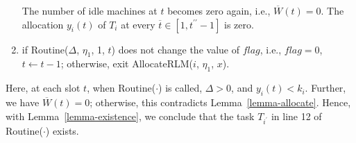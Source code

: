 \documentclass[10pt,journal,compsoc]{IEEEtran}
\begin{document}
\begin{enumerate}
       The number of idle machines at $t$ becomes zero again, i.e., $\overline{W}(t)=0$. The allocation $y_{i}(t)$ of $T_{i}$ at every $\overline{t}\in [1, t^{\prime\prime}-1]$ is zero.

  \item if Routine($\Delta$, $\eta_{1}$, 1, $t$) does not change the value of $flag$, i.e., $flag = 0$, $t\leftarrow t-1$; otherwise, exit AllocateRLM($i$, $\eta_{1}$, $x$).

\end{enumerate}
Here, at each slot $t$, when Routine($\cdot$) is called, $\Delta>0$, and $y_{i}(t)<k_{i}$. Further, we have $\overline{W}(t)=0$; otherwise, this contradicts Lemma~\ref{lemma-allocate}. Hence, with Lemma~\ref{lemma-existence}, we conclude that the task $T_{i^{\prime}}$ in line 12 of Routine($\cdot$) exists.
\end{document}
